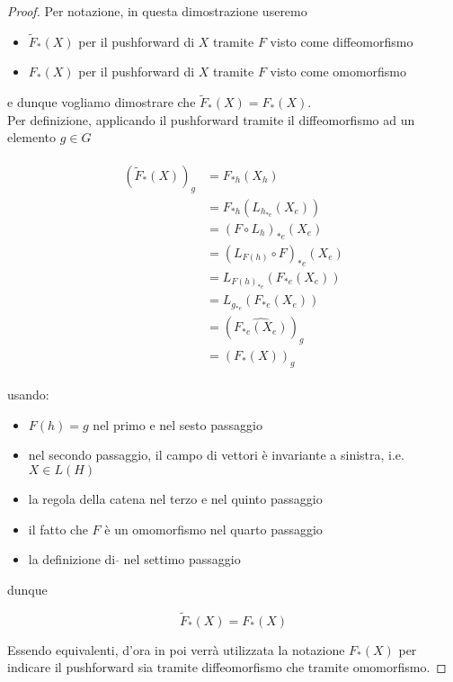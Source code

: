 \begin{proof}
	Per notazione, in questa dimostrazione useremo
	
	\begin{itemize}
		\item $ \tilde{F}_{*}(X) $ per il pushforward di $ X $ tramite $ F $ visto come diffeomorfismo
		
		\item $ F_{*}(X) $ per il pushforward di $ X $ tramite $ F $ visto come omomorfismo
	\end{itemize}

	e dunque vogliamo dimostrare che $ \tilde{F}_{*}(X) = F_{*}(X) $.\\
	Per definizione, applicando il pushforward tramite il diffeomorfismo ad un elemento $ g \in G $
	
	\begin{align}
		\begin{split}
			(\tilde{F}_{*}(X))_{g} &= F_{*h}(X_{h})\\
			&= F_{*h}(L_{h_{*e}}(X_{e}))\\
			&= (F \circ L_{h})_{*e} (X_{e})\\
			&= (L_{F(h)} \circ F)_{*e} (X_{e})\\
			&= L_{F(h)_{*e}} (F_{*e}(X_{e}))\\
			&= L_{g_{*e}} (F_{*e}(X_{e}))\\
			&= (\widehat{ F_{*e}(X_{e}) })_{g}\\
			&= (F_{*}(X))_{g}
		\end{split}
	\end{align}

	usando:
	
	\begin{itemize}
		\item $ F(h) = g $ nel primo e nel sesto passaggio
		
		\item nel secondo passaggio, il campo di vettori è invariante a sinistra, i.e. $ X \in L(H) $
		
		\item la regola della catena nel terzo e nel quinto passaggio
		
		\item il fatto che $ F $ è un omomorfismo nel quarto passaggio
		
		\item la definizione di $ \hat{} $ nel settimo passaggio
	\end{itemize}

	dunque
	
	\begin{equation}
		\tilde{F}_{*}(X) = F_{*}(X)
	\end{equation}

	Essendo equivalenti, d'ora in poi verrà utilizzata la notazione $ F_{*}(X) $ per indicare il pushforward sia tramite diffeomorfismo che tramite omomorfismo.
\end{proof}

